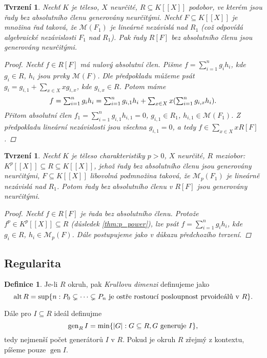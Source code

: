 \documentclass[11pt,a4paper]{article}
\newcommand\p[1]{\mathcal{ #1 }} %
\newcommand*{\ml}[1]{\[\textstyle\let\displaystyle\textstyle#1\]}	%
\DeclareMathOperator{\alt}{alt} %
\DeclareMathOperator{\gen}{gen} %
\newcounter{numb}
\theoremstyle{definition}
\newtheorem*{definice}{Definice}
\theoremstyle{plain}
\newtheorem{tvrzeni}[numb]{Tvrzení}
\begin{document}
\begin{tvrzeni}
	Nechť $K$ je těleso, $X$ neurčité, $R \subseteq K[[X]]$ podobor, ve kterém jsou řady bez absolutního členu generovány neurčitými. Nechť $F \subseteq K[[X]]$ je množina řad taková, že $\p M(F_1)$ je lineárně nezávislá nad $R_1$ (což odpovídá algebraické nezávislosti $F_1$ nad $R_1$). Pak řady $R[F]$ bez absolutního členu jsou generovány neurčitými.
	
	\begin{proof}
		\newcommand*{\I}{_{i = 1}^n}
		
		Nechť $f \in R[F]$ má nulový absolutní člen. Pišme $f = \sum\I g_i h_i$, kde $g_i \in R$, $h_i$ jsou prvky $\p M(F)$. Dle předpokladu můžeme psát $g_i = g_{i, 1} + \sum_{x \in X} x g_{i, x}$, kde $g_{i, x} \in R$. Potom máme
		\ml{
			f = \sum\I g_i h_i = \sum\I g_{i, 1} h_i + \sum_{x \in X} x (\sum\I g_{i, x} h_i).
		}
		Přitom absolutní člen $f_1 = \sum\I g_{i, 1} h_{i, 1} = 0$, $g_{i, 1} \in R_1$, $h_{i, 1} \in \p M(F_1)$. Z předpokladu lineární nezávislosti jsou všechna $g_{i, 1} = 0$, a tedy $f \in \sum_{x \in X} x R[F]$. 
	\end{proof}
\end{tvrzeni}

\begin{tvrzeni} \label{thm:RpF_absOK}
	Nechť $K$ je těleso charakteristiky $p > 0$, $X$ neurčité, $R$ meziobor: $K^p[[X]] \subseteq R \subseteq K[[X]]$, jehož řady bez absolutního členu jsou generovány neurčitými, $F \subseteq K[[X]]$ libovolná podmnožina taková, že $\p M_p(F_1)$ je lineárně nezávislá nad $R_1$. Potom řady bez absolutního členu v $R[F]$ jsou generovány neurčitými.
	
	\begin{proof}
		Nechť $f \in R[F]$ je řada bez absolutního členu. Protože $f^p \in K^p[[X]] \subseteq R$ (důsledek \ref{thm:p_power}), lze psát $f = \sum_{i = 1}^n g_i h_i$, kde $g_i \in R$, $h_i \in \p M_p(F)$. Dále postupujeme jako v důkazu předchozího tvrzení.
	\end{proof}
\end{tvrzeni}
	

\subsection{Regularita}

\begin{definice}
	Je-li $R$ okruh, pak \emph{Krullovu dimenzi} definujeme jako
	\ml{
		\alt R = \sup\{n: P_0 \subsetneq \cdots \subsetneq P_n \text{ je ostře rostoucí posloupnost prvoideálů v } R\}.
	}

	Dále pro $I \subseteq R$ ideál definujme
	\ml{
		\gen_R I = \min\{|G|: G \subseteq R, G \text{ generuje } I\},
	}
	tedy nejmenší počet generátorů $I$ v $R$. Pokud je okruh $R$ zřejmý z kontextu, píšeme pouze $\gen I$.
\end{definice}
\end{document}
